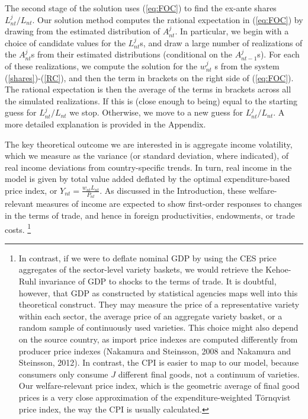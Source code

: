 \documentclass[12pt]{article}
\begin{document}
The second stage of the solution uses (\ref{eq:FOC}) to find the
ex-ante shares $L_{nt}^{j}/L_{nt}$. Our solution method computes
the rational expectation in (\ref{eq:FOC}) by drawing from the
estimated distribution of $A_{nt}^{j}$. In particular, we begin
with a choice of candidate values for the $L_{nt}^{j}$s, and draw a
large number of realizations of the $A_{nt}^{j}$s from their
estimated distributions (conditional on the $A_{nt-1}^{j}$s). For
each of these realizations, we compute the solution for the $w_{nt}^{j}$%
s from the system (\ref{shares})-(\ref{RC}), and then the term in
brackets on the right side of (\ref{eq:FOC}). The rational expectation is
then the average of the terms in brackets across all the simulated
realizations. If this is (close enough to being) equal to the starting guess
for $L_{nt}^{j}/L_{nt}$ we stop. Otherwise, we move to a new guess
for $L_{nt}^{j}/L_{nt}$. A more detailed explanation is provided in
the Appendix.

The key theoretical outcome we are interested in is aggregate income
volatility, which we measure as the variance (or standard deviation, where
indicated), of real income deviations from country-specific trends. In turn,
real income in the model is given by total value added deflated by the
optimal expenditure-based price index, or $Y_{nt}=\frac{w_{nt}L_{nt}}{P_{nt}}%
.$ As discussed in the Introduction, these welfare-relevant measures of
income are expected to show first-order responses to changes in the terms of
trade, and hence in foreign productivities, endowments, or trade costs.%
\footnote{%
In contrast, if we were to deflate nominal GDP by using the CES price
aggregates of the sector-level variety baskets, we would retrieve the
Kehoe-Ruhl invariance of GDP to shocks to the terms of trade. It is
doubtful, however, that GDP as constructed by statistical agencies maps well
into this theoretical construct. They may measure the price of a
representative variety within each sector, the average price of an aggregate
variety basket, or a random sample of continuously used varieties. This
choice might also depend on the source country, as import price indexes are
computed differently from producer price indexes (Nakamura and Steinsson,
2008 and Nakamura and Steinsson, 2012). In contrast, the CPI is
easier to map to our model, because consumers only consume $J$ different final
goods, not a continuum of varieties. Our welfare-relevant price index, which
is the geometric average of final good prices is a very close approximation
of the expenditure-weighted T\"{o}rnqvist price index, the way the CPI is
usually calculated.}
\end{document}
